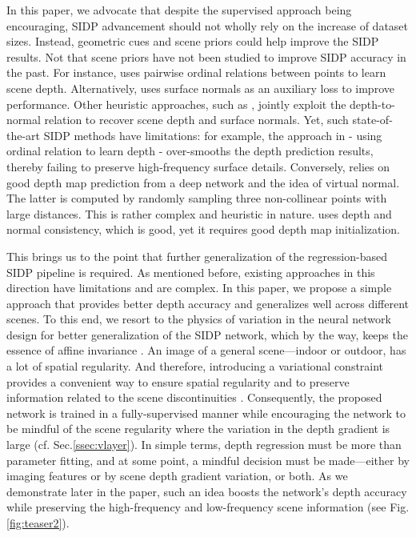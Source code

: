 \documentclass{article} \usepackage{iclr2023_conference, times}
\begin{document}
In this paper, we advocate that despite the supervised approach being encouraging, SIDP advancement should not wholly rely on the increase of dataset sizes. Instead, geometric cues and scene priors could help improve the SIDP results. Not that scene priors have not been studied to improve SIDP accuracy in the past. For instance, \citet{chen2016single} uses pairwise ordinal relations between points to learn scene depth. Alternatively, \citet{yin2019enforcing} uses surface normals as an auxiliary loss to improve performance. Other heuristic approaches, such as \citet{qi2018geonet}, jointly exploit the depth-to-normal relation to recover scene depth and surface normals. Yet, such state-of-the-art SIDP methods have limitations: for example, the approach in \citet{chen2016single} - using ordinal relation to learn depth - over-smooths the depth prediction results, thereby failing to preserve high-frequency surface details. Conversely, \citet{yin2019enforcing} relies on good depth map prediction from a deep network and the idea of virtual normal. The latter is computed by randomly sampling three non-collinear points with large distances. This is rather complex and heuristic in nature.  \citet{qi2018geonet} uses depth and normal consistency, which is good, yet it requires good depth map initialization. 

This brings us to the point that further generalization of the regression-based SIDP pipeline is required. As mentioned before, existing approaches in this direction have limitations and are complex. In this paper, we propose a simple approach that provides better depth accuracy and generalizes well across different scenes. To this end, we resort to the physics of variation \citep{mollenhoff2016sublabel, chambolle2010introduction} in the neural network design for better generalization of the SIDP network, which by the way, keeps the essence of affine invariance \citep{yin2019enforcing}. An image of a general scene---indoor or outdoor, has a lot of spatial regularity. And therefore, introducing a variational constraint provides a convenient way to ensure spatial regularity and to preserve information related to the scene discontinuities \citep{chambolle2010introduction}. Consequently, the proposed network is trained in a fully-supervised manner while encouraging the network to be mindful of the scene regularity where the variation in the depth gradient is large (cf. Sec.\ref{ssec:vlayer}). In simple terms, depth regression must be more than parameter fitting, and at some point, a mindful decision must be made---either by imaging features or by scene depth gradient variation, or both. As we demonstrate later in the paper, such an idea boosts the network's depth accuracy while preserving the high-frequency and low-frequency scene information (see Fig.\ref{fig:teaser2}).
\end{document}
